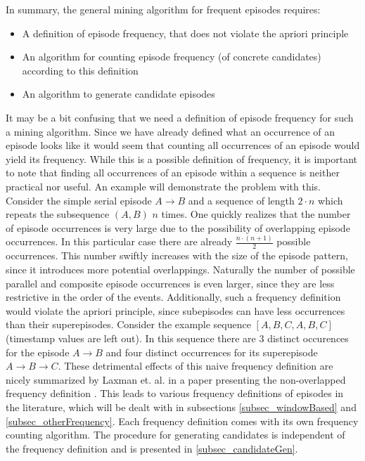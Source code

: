In summary, the general mining algorithm for frequent episodes requires:

\begin{itemize}
	\item A definition of episode frequency, that does not violate the apriori principle
	\item An algorithm for counting episode frequency (of concrete candidates) according to this definition
	\item An algorithm to generate candidate episodes
\end{itemize}

It may be a bit confusing that we need a definition of episode frequency for such a mining algorithm. Since we have already defined what an occurrence of an episode looks like it would seem that counting all occurrences of an episode would yield its frequency. While this is a possible definition of frequency, it is important to note that finding all occurrences of an episode within a sequence is neither practical nor useful. An example will demonstrate the problem with this. Consider the simple serial episode $A \rightarrow B$ and a sequence of length $2\cdot n$ which repeats the subsequence $(A,B)$ $n$ times. One quickly realizes that the number of episode occurrences is very large due to the possibility of overlapping episode occurrences. In this particular case there are already $ \frac{n \cdot (n+1)}{2}$ possible occurrences. This number swiftly increases with the size of the episode pattern, since it introduces more potential overlappings. Naturally the number of possible parallel and composite episode occurrences is even larger, since they are less restrictive in the order of the events. Additionally, such a frequency definition would violate the apriori principle, since subepisodes can have less occurrences than their superepisodes. Consider the example sequence $[A,B,C,A,B,C]$ (timestamp values are left out). In this sequence there are 3 distinct occurences for the episode $A \rightarrow B$ and four distinct occurrences for its superepisode $A \rightarrow B \rightarrow C$. These detrimental effects of this naive frequency definition are nicely summarized by Laxman et. al. in a paper presenting the non-overlapped frequency definition \cite{laxman2007fast}. \newline
This leads to various frequency definitions of episodes in the literature, which will be dealt with in subsections \ref{subsec_windowBased} and \ref{subsec_otherFrequency}. Each frequency definition comes with its own frequency counting algorithm. The procedure for generating candidates is independent of the frequency definition and is presented in \ref{subsec_candidateGen}. \newline


